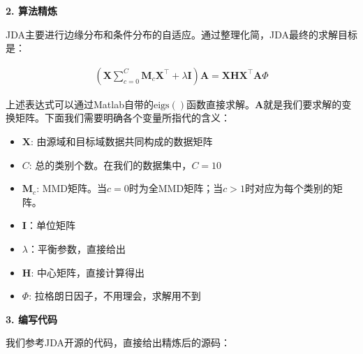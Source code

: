 \textbf{2. 算法精炼}

JDA主要进行边缘分布和条件分布的自适应。通过整理化简，JDA最终的求解目标是：

\begin{equation}
\label{equ-eigen}
\begin{split}
\left(\mathbf{X} \sum_{c=0}^{C} \mathbf{M}_c \mathbf{X}^\top + \lambda \mathbf{I}\right) \mathbf{A} =\mathbf{X} \mathbf{H} \mathbf{X}^\top \mathbf{A} \Phi 
\end{split}
\end{equation}

上述表达式可以通过Matlab自带的$\mathrm{eigs()}$函数直接求解。$\mathbf{A}$就是我们要求解的变换矩阵。下面我们需要明确各个变量所指代的含义：

\begin{itemize}
	\item $\mathbf{X}$: 由源域和目标域数据共同构成的数据矩阵
	\item $C$: 总的类别个数。在我们的数据集中，$C=10$
	\item $\mathbf{M}_c$: MMD矩阵。当$c=0$时为全MMD矩阵；当$c>1$时对应为每个类别的矩阵。
	\item $\mathbf{I}$：单位矩阵
	\item $\lambda$：平衡参数，直接给出
	\item $\mathbf{H}$: 中心矩阵，直接计算得出
	\item $\Phi$: 拉格朗日因子，不用理会，求解用不到
\end{itemize}

\textbf{3. 编写代码}

我们参考JDA开源的代码，直接给出精炼后的源码：

